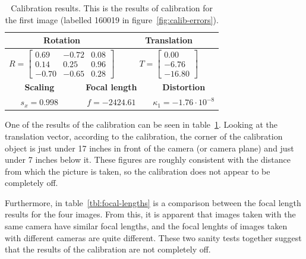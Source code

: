 \begin{table}[htb]
  \centering
  \begin{tabular}{c c c c c c}
    \toprule
    \multicolumn{3}{c}{\textbf{Rotation}} & \multicolumn{3}{c}{\textbf{Translation}}\\
    \midrule
    \multicolumn{3}{c}{$R=\begin{bmatrix}0.69 & -0.72 & 0.08\\
    0.14 & 0.25 & 0.96\\
    -0.70 & -0.65 & 0.28\end{bmatrix}$} &
    \multicolumn{3}{c}{$T=\begin{bmatrix}0.00\\-6.76\\-16.80\end{bmatrix}$} \\
    \midrule
    \multicolumn{2}{c}{\textbf{Scaling}} &
    \multicolumn{2}{c}{\textbf{Focal length}} &
    \multicolumn{2}{c}{\textbf{Distortion}}\\
    \midrule
    \multicolumn{2}{c}{$s_x =0.998$} &
    \multicolumn{2}{c}{$f=-2424.61$} &
    \multicolumn{2}{c}{$\kappa_1=-1.76 \cdot 10^{-8}$}\\
    \bottomrule
  \end{tabular}
  \caption[Calibration results]{Calibration results. This is the
    results of calibration for the first image (labelled 160019 in
    figure~\ref{fig:calib-errors}).}
  \label{tbl:calib-results}
\end{table}

One of the results of the calibration can be seen in
table~\ref{tbl:calib-results}. Looking at the translation vector,
according to the calibration, the corner of the calibration object is
just under 17 inches in front of the camera (or camera plane) and just
under 7 inches below it. These figures are roughly consistent with the
distance from which the picture is taken, so the calibration does not
appear to be completely off.

Furthermore, in table~\ref{tbl:focal-lengths} is a comparison
between the focal length results for the four images. From this, it is
apparent that images taken with the same camera have similar focal
lengths, and the focal lenghts of images taken with different cameras
are quite different. These two sanity tests together suggest that the
results of the calibration are not completely off.

